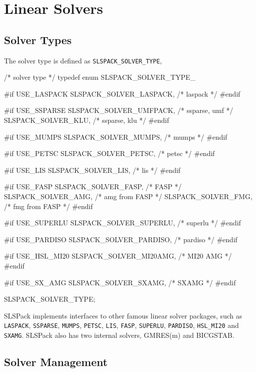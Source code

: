 \chapter{Linear Solvers}

\section{Solver Types}
The solver type is defined as \verb|SLSPACK_SOLVER_TYPE|,

\begin{evb}
/* solver type */
typedef enum SLSPACK_SOLVER_TYPE_
{
#if USE_LASPACK
    SLSPACK_SOLVER_LASPACK,   /* laspack */
#endif

#if USE_SSPARSE
    SLSPACK_SOLVER_UMFPACK,   /* ssparse, umf */
    SLSPACK_SOLVER_KLU,       /* ssparse, klu */
#endif

#if USE_MUMPS
    SLSPACK_SOLVER_MUMPS,     /* mumps */
#endif

#if USE_PETSC
    SLSPACK_SOLVER_PETSC,     /* petsc */
#endif

#if USE_LIS
    SLSPACK_SOLVER_LIS,       /* lis */
#endif

#if USE_FASP
    SLSPACK_SOLVER_FASP,      /* FASP */
    SLSPACK_SOLVER_AMG,       /* amg from FASP */
    SLSPACK_SOLVER_FMG,       /* fmg from FASP */
#endif

#if USE_SUPERLU
    SLSPACK_SOLVER_SUPERLU,   /* superlu */
#endif

#if USE_PARDISO
    SLSPACK_SOLVER_PARDISO,   /* pardiso */
#endif

#if USE_HSL_MI20
    SLSPACK_SOLVER_MI20AMG,   /* MI20 AMG */
#endif

#if USE_SX_AMG
    SLSPACK_SOLVER_SXAMG,     /* SXAMG */
#endif

} SLSPACK_SOLVER_TYPE;
\end{evb}

SLSPack implements interfaces to other famous linear solver packages, such as
\verb|LASPACK|, \verb|SSPARSE|, \verb|MUMPS|, \verb|PETSC|, \verb|LIS|,
\verb|FASP|, \verb|SUPERLU|, \verb|PARDISO|, \verb|HSL_MI20| and \verb|SXAMG|.
SLSPack also has two internal solvers, GMRES(m) and BICGSTAB.

\section{Solver Management}

